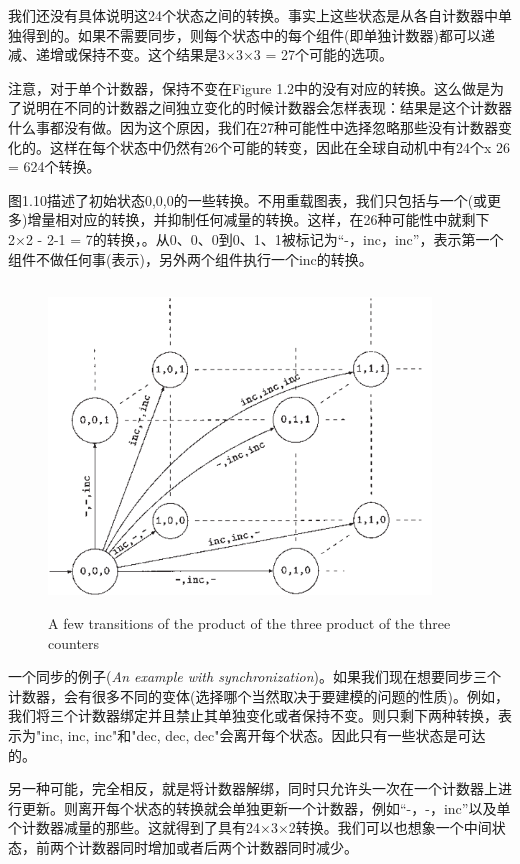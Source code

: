 \documentclass{book}
\begin{document}
    我们还没有具体说明这24个状态之间的转换。事实上这些状态是从各自计数器中单独得到的。如果不需要同步，则每个状态中的每个组件(即单独计数器)都可以递减、递增或保持不变。这个结果是3×3×3 = 27个可能的选项。

    注意，对于单个计数器，保持不变在Figure 1.2中的没有对应的转换。这么做是为了说明在不同的计数器之间独立变化的时候计数器会怎样表现：结果是这个计数器什么事都没有做。因为这个原因，我们在27种可能性中选择忽略那些没有计数器变化的。这样在每个状态中仍然有26个可能的转变，因此在全球自动机中有24个x 26 = 624个转换。

    图1.10描述了初始状态0,0,0的一些转换。不用重载图表，我们只包括与一个(或更多)增量相对应的转换，并抑制任何减量的转换。这样，在26种可能性中就剩下2×2 - 2-1 = 7的转换，。从0、0、0到0、1、1被标记为“-，inc，inc”，表示第一个组件不做任何事(表示)，另外两个组件执行一个inc的转换。
    \begin{figure}
    \centering
    \includegraphics[height=3.4in,width=4.0in]{1_10.png}
    \caption{A few transitions of the product of the three product of the three counters}
    \end{figure}

    一个同步的例子({\itshape An example with synchronization})。如果我们现在想要同步三个计数器，会有很多不同的变体(选择哪个当然取决于要建模的问题的性质)。例如，我们将三个计数器绑定并且禁止其单独变化或者保持不变。则只剩下两种转换，表示为"inc, inc, inc"和"dec, dec, dec"会离开每个状态。因此只有一些状态是可达的。

    另一种可能，完全相反，就是将计数器解绑，同时只允许头一次在一个计数器上进行更新。则离开每个状态的转换就会单独更新一个计数器，例如“-，-，inc”以及单个计数器减量的那些。这就得到了具有24×3×2转换。我们可以也想象一个中间状态，前两个计数器同时增加或者后两个计数器同时减少。
\end{document}
